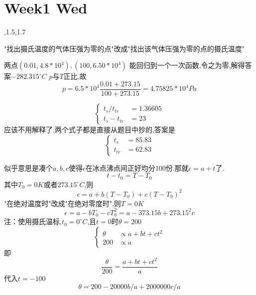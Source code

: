 \section{Week1 Wed}
,1.5,1.7

"找出摄氏温度的气体压强为零的点"改成"找出该气体压强为零的点的摄氏温度"

两点$(0.01, 4.8*10^4), (100, 6.50*10^4)$
能回归到一个一次函数,令之为零,解得答案$-282.315^{\circ}C$
$p$与$T$正比,故
\begin{equation}
p=6.5*10^4 \frac{0.01 + 273.15}{100 + 273.15}=4.75825*10^4 Pa
\end{equation}

\begin{equation}
	\left\{\begin{aligned}
	t_s/t_{tr}&=1.36605\\
	t_s-t_{tr}&=23
	\end{aligned}\right.
\end{equation}
应该不用解释了,两个式子都是直接从题目中抄的,答案是
\begin{equation}
\left\{\begin{aligned}
t_s &= 85.83\\
t_{tr}&=62.83
\end{aligned}\right.
\end{equation}

似乎意思是凑个$a,b,c$使得$\epsilon$在冰点沸点间正好均分$100$份.那就$\epsilon=a+t$了.
\begin{equation}
	t-t_0 = T-T_0
\end{equation}
其中$T_0=0K$或者$273.15 ^{\circ}C$,则
\begin{equation}
	\epsilon = a+b(T-T_0)+c(T-T_0)^2
\end{equation}
"在绝对温度时"改成"在绝对零度时",则$T=0K$
\begin{equation}
\epsilon = a-b T_0 -cT_0^2 = a - 373.15 b +  273.15^2 c
\end{equation}
注：使用摄氏温标,$t_0=0^{\circ}C$,且$t=0$时$\theta=200$
\begin{equation}
\left\{\begin{aligned}
\theta &\propto a+bt+ct^2 \\
200    &\propto a
\end{aligned}\right.
\end{equation}即
\begin{equation}
\frac{\theta}{200}=\frac{a+bt+ct^2}{a}
\end{equation}
代入$t=-100$
\begin{equation}
\theta = 200 - 20000b/a + 2000000 c/a
\end{equation}
